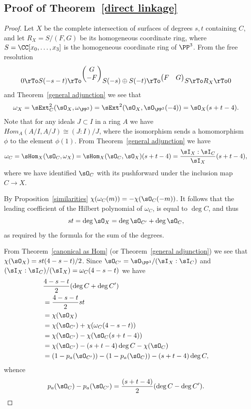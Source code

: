 \subsection{Proof of Theorem~\ref{direct linkage}}

\begin{proof}
 Let $X$ be the complete intersection of surfaces of degrees $s,t$ containing $C$, and let $R_X = S/(F,G)$ be its homogeneous coordinate ring, where
$S = \CC[x_0,\dots,x_3]$ is the homogeneous coordinate ring of $\PP^3$.
From the free resolution
$$
0\rTo S(-s-t) \rTo^{
\begin{pmatrix}
 G \\ -F
\end{pmatrix}}
 S(-s)\oplus S(-t) \rTo^{
\begin{pmatrix}
 F & G
\end{pmatrix}}
 S \rTo R_{X} \rTo 0
$$
 and Theorem~\ref{general adjunction} we see that
 $$
\omega_X =  \sExt^2_C(\sO_X, \omega_{\PP^3}) =\sExt^2(\sO_X, \sO_{\PP^3}(-4)) = \sO_X(s+t-4).
 $$
Note that for any ideals $J\subset I$ in a ring $A$ we have $Hom_A(A/I, A/J) \cong (J:I)/J$, where the isomorphism
sends a homomorphism $\phi$ to the element $\phi(1)$. From Theorem~\ref{general adjunction} we have 
$$
\omega_C = \sHom_X(\sO_C, \omega_X) = \sHom_X(\sO_C, \sO_X)(s+t-4) = \frac{\sI_X:\sI_C}{\sI_X}(s+t-4),
$$
where we have identified $\sO_C$ with its pushforward under the inclusion map $C\to X$. 

By Proposition~\ref{similarities}
$\chi(\omega_C(m)) = -\chi(\sO_C(-m))$. It follows that the leading coefficient of the Hilbert polynomial of $\omega_C$, is 
equal to $\deg C$, and thus
$$
st = \deg \sO_X = \deg \sO_{C'}+\deg \sO_C,
$$
as required by the formula for the sum of the degrees.

From Theorem~\ref{canonical as Hom} (or Theorem~\ref{general adjunction}) we see that $\chi(\sO_X) = st(4-s-t)/2$. Since $\sO_{C'} = \sO_{\PP^3}/(\sI_X : \sI_C)$ and
$(\sI_X : \sI_C)/(\sI_X) = \omega_C(4-s-t)$ we have
$$
\begin{aligned}
&\frac{4-s-t}{2}(\deg C+\deg C')\\
&=\frac{4-s-t}{2}st\\
&=\chi(\sO_X) \\
&=  \chi(\sO_{C'})+\chi(\omega_C(4-s-t)) \\
&= \chi(\sO_{C'})-\chi(\sO_C(s+t-4)) \\&= \chi(\sO_{C'})-(s+t-4)\deg C-\chi(\sO_C)\\
&= (1-p_a(\sO_{C'})) - (1-p_a(\sO_C)) -(s+t-4)\deg C,
\end{aligned}
$$
whence 
$$
p_a(\sO_C) -p_a(\sO_{C'}) = \frac{(s+t-4)}{2} (\deg C - \deg C'). 
$$
 \end{proof}

